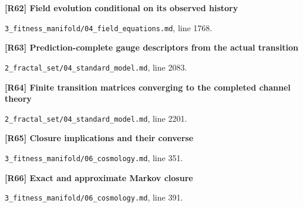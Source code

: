 \documentclass[11pt,a4paper]{article}
\begin{document}
\par\medskip\noindent\begin{minipage}{\linewidth}\textbf{[R62] Field evolution conditional on its observed history}\label{src:thm-algorithmic-field-filter}\par
{\small\texttt{}\par
\nolinkurl{3_fitness_manifold/04_field_equations.md}, line 1768.\par}
\end{minipage}\par

\par\medskip\noindent\begin{minipage}{\linewidth}\textbf{[R63] Prediction-complete gauge descriptors from the actual transition}\label{src:thm-sm-prediction-complete-descriptors}\par
{\small\texttt{}\par
\nolinkurl{2_fractal_set/04_standard_model.md}, line 2083.\par}
\end{minipage}\par

\par\medskip\noindent\begin{minipage}{\linewidth}\textbf{[R64] Finite transition matrices converging to the completed channel theory}\label{src:thm-sm-predictive-partition-convergence}\par
{\small\texttt{}\par
\nolinkurl{2_fractal_set/04_standard_model.md}, line 2201.\par}
\end{minipage}\par

\par\medskip\noindent\begin{minipage}{\linewidth}\textbf{[R65] Closure implications and their converse}\label{src:thm-closure-equivalence-cosmo}\par
{\small\texttt{}\par
\nolinkurl{3_fitness_manifold/06_cosmology.md}, line 351.\par}
\end{minipage}\par

\par\medskip\noindent\begin{minipage}{\linewidth}\textbf{[R66] Exact and approximate Markov closure}\label{src:prop-cosmo-generator-closure}\par
{\small\texttt{}\par
\nolinkurl{3_fitness_manifold/06_cosmology.md}, line 391.\par}
\end{minipage}\par
\end{document}
